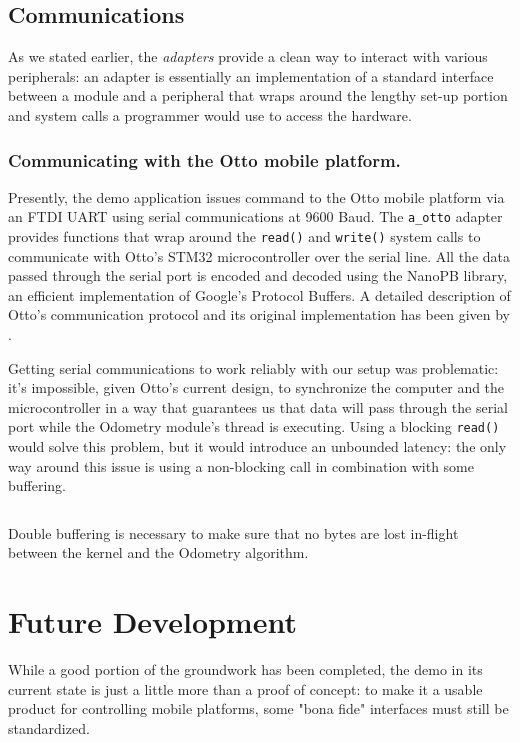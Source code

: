\documentclass[a4paper,12pt]{report}
\begin{document}

\subsection{Communications}

As we stated earlier, the \textit{adapters} provide a clean way to interact with various peripherals: an adapter is essentially an implementation of a standard interface between a module and a peripheral that wraps around the lengthy set-up portion and system calls a programmer would use to access the hardware.

\subsubsection{Communicating with the Otto mobile platform.}

Presently, the demo application issues command to the Otto mobile platform via an FTDI UART using serial communications at 9600 Baud. The \texttt{a\_otto} adapter provides functions that wrap around the \texttt{read()} and \texttt{write()} system calls to communicate with Otto's STM32 microcontroller over the serial line. All the data passed through the serial port is encoded and decoded using the NanoPB library, an efficient implementation of Google's Protocol Buffers. A detailed description of Otto's communication protocol and its original implementation has been given by \textcite{fdila-bs-otto}.

Getting serial communications to work reliably with our setup was problematic: it's impossible, given Otto's current design, to synchronize the computer and the microcontroller in a way that guarantees us that data will pass through the serial port while the Odometry module's thread is executing. Using a blocking \texttt{read()} would solve this problem, but it would introduce an unbounded latency: the only way around this issue is using a non-blocking call in combination with some buffering.

\begin{listing}[H]
\inputminted[frame=single,framesep=10pt]{c}{snippets/otto-buffering.c}
\caption{Double buffering is necessary to make sure that no bytes are lost in-flight between the kernel and the Odometry algorithm.}
\end{listing}

\section{Future Development}
While a good portion of the groundwork has been completed, the demo in its current state is just a little more than a proof of concept: to make it a usable product for controlling mobile platforms, some "bona fide" interfaces must still be standardized.
\end{document}
